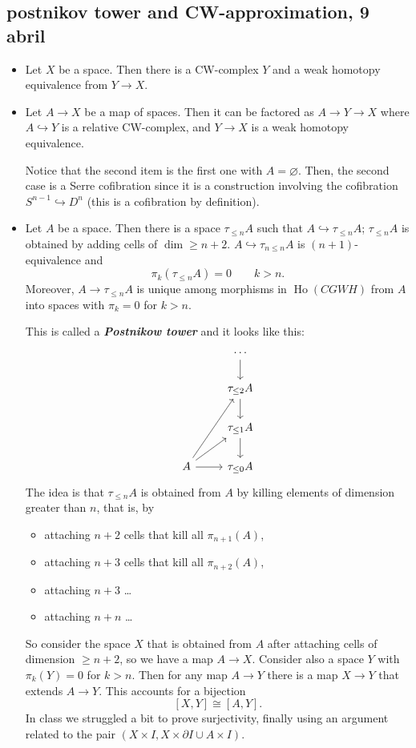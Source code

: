 \documentclass{article}
\DeclareMathOperator{\Ho}{Ho}
\begin{document}
\subsection{postnikov tower and CW-approximation, 9 abril}
\begin{itemize}
	\item Let $X$ be a space. Then there is a CW-complex $Y$ and a weak homotopy equivalence from $Y\to X$.
	\item Let $A\to X$ be a map of spaces. Then it can be factored as $A\to Y\to X$ where $A\hookrightarrow Y$ is a relative CW-complex, and $Y\to X$ is a weak homotopy equivalence.

\begin{remark}
	Notice that the second item is the first one with $A=\varnothing$. Then, the second case is a Serre cofibration since it is a construction involving the cofibration $S^{n-1}\hookrightarrow D^n$ (this is a cofibration by definition).
\end{remark}
\item Let $A$ be a space. Then there is a space $\tau_{\leq n}A$ such that $A\hookrightarrow\tau_{\leq n}A$; $\tau_{\leq n}A$ is obtained by adding cells of $\dim\geq n+2$. $A\hookrightarrow\tau_{n\leq n}A$ is $(n+1)$-equivalence and
\[\pi_k(\tau_{\leq n}A)=0\qquad k>n.\]
Moreover, $A\to \tau_{\leq n}A$ is unique among morphisms in $\Ho(CGWH)$ from $A$ into spaces with $\pi_k=0$ for $k>n$.

This is called a \textbf{\textit{Postnikow tower}} and it looks like this:
\[\begin{tikzcd}
	&\cdots\arrow[d]\\
	&\tau_{\leq 2}A\arrow[d]\\
	&\tau_{\leq 1}A\arrow[d]\\
	A\arrow[uur]\arrow[ur]\arrow[r]&\tau_{\leq 0}A
\end{tikzcd}\]
The idea is that $\tau_{\leq n}A$ is obtained from $A$ by killing elements of dimension greater than $n$, that is, by \begin{itemize}
	\item attaching $n+2$ cells that kill all $\pi_{n+1}(A)$,
	\item attaching $n+3$ cells that kill all $\pi_{n+2}(A)$,
	\item attaching $n+3$ …
	\item attaching $n+n$ …
\end{itemize}
So consider the space $X$ that is obtained from $A$ after attaching cells of dimension $\geq n+2$, so we have a map $A\to X$. Consider also a space $Y$ with $\pi_k(Y)=0$ for $k>n$. Then for any map $A\to Y$ there is a map $X\to Y$ that extends $A\to Y$. This accounts for a bijection 
\[[X,Y]\cong[A,Y].\]
In class we struggled a bit to prove surjectivity, finally using an argument related to the pair $(X\times I,X\times\partial I\cup A\times I)$.


\end{itemize}
\end{document}
